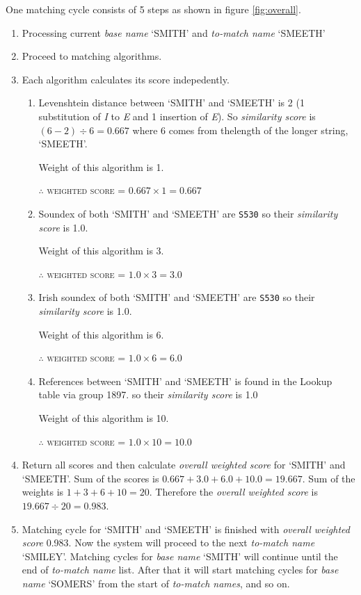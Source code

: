 One matching cycle consists of 5 steps as shown in figure \ref{fig:overall}.

\begin{enumerate}
  \item Processing current \emph{base name} `SMITH' and \emph{to-match name} `SMEETH'
  \item Proceed to matching algorithms.
  \item Each algorithm calculates its score indepedently.
    \begin{enumerate}
      \item Levenshtein distance between `SMITH' and `SMEETH' is 2
        (1 substitution of \emph{I} to \emph{E} and 1 insertion of \emph{E}).
        So \emph{similarity score} is $(6 - 2) \div 6 = 0.667$ where 6 comes from thelength of the
        longer string, `SMEETH'.

        Weight of this algorithm is 1.

        \textsc{$\therefore$ weighted score = $0.667 \times 1 = 0.667$}
      \item Soundex of both `SMITH' and `SMEETH' are \texttt{S530} so their
        \emph{similarity score} is 1.0.

        Weight of this algorithm is 3.

        \textsc{$\therefore$ weighted score = $1.0 \times 3 = 3.0$}
      \item Irish soundex of both `SMITH' and `SMEETH' are \texttt{S530} so their
        \emph{similarity score} is 1.0.

        Weight of this algorithm is 6.

        \textsc{$\therefore$ weighted score = $1.0 \times 6 = 6.0$}
      \item References between `SMITH' and `SMEETH' is found in the
        Lookup table via group 1897. so their \emph{similarity score} is 1.0

        Weight of this algorithm is 10.

        \textsc{$\therefore$ weighted score = $1.0 \times 10 = 10.0$}
    \end{enumerate}
  \item Return all scores and then calculate \emph{overall weighted score}
    for `SMITH' and `SMEETH'. Sum of the scores is
    $0.667 + 3.0 + 6.0 + 10.0 = 19.667$. Sum of the weights is
    $1 + 3 + 6 + 10 = 20$. Therefore the \emph{overall weighted score} is
    $19.667 \div 20 = 0.983$.
  \item Matching cycle for `SMITH' and `SMEETH' is finished with
    \emph{overall weighted score} 0.983.
    Now the system will proceed to the next \emph{to-match name} `SMILEY'.
    Matching cycles for \emph{base name} `SMITH' will continue until
    the end of \emph{to-match name} list. After that it will start
    matching cycles for \emph{base name} `SOMERS' from the start of
    \emph{to-match names}, and so on.
\end{enumerate}

